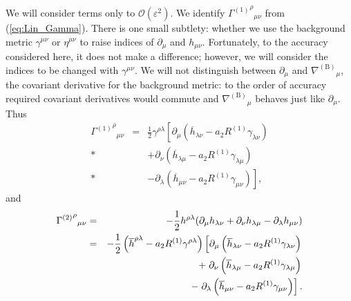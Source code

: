 \documentclass[aps,prd,amsfonts,amssymb,amsmath,nofootinbib,reprint,showpacs]{revtex4-1}
\newcommand{\eqnref}[1]{(\ref{eq:#1})}
\newcommand{\order}[1]{\ensuremath{\mathcal{O}({#1})}}
\begin{document}
We will consider terms only to $\order{\varepsilon^2}$. We identify ${{\Gamma^{(1)}}^\rho}_{\mu\nu}$ from \eqnref{Lin_Gamma}. There is one small subtlety: whether we use the background metric $\gamma^{\mu\nu}$ or $\eta^{\mu\nu}$ to raise indices of $\partial_\mu$ and $h_{\mu\nu}$. Fortunately, to the accuracy considered here, it does not make a difference; however, we will consider the indices to be changed with $\gamma^{\mu\nu}$. We will not distinguish between $\partial_\mu$ and ${\nabla^{(\text{B})}}_\mu$, the covariant derivative for the background metric: to the order of accuracy required covariant derivatives would commute and ${\nabla^{(\text{B})}}_\mu$ behaves just like $\partial_\mu$. Thus
\begin{eqnarray}
{{\Gamma^{(1)}}^\rho}_{\mu\nu} & = & \frac{1}{2}\gamma^{\rho\lambda}\left[\partial_\mu \left(\overline{h}_{\lambda\nu} - a_2 R^{(1)}\gamma_{\lambda\nu}\right) \right. \nonumber \\* 
 & & + \left. \partial_\nu \left(\overline{h}_{\lambda\mu} - a_2 R^{(1)}\gamma_{\lambda\mu}\right) \right. \nonumber \\*
 & & - \left. \partial_\lambda \left(\overline{h}_{\mu\nu} - a_2 R^{(1)}\gamma_{\mu\nu}\right)\right],
\end{eqnarray}
and
\begin{eqnarray}
{{\Gamma^{(2)}}^\rho}_{\mu\nu} & = & -\frac{1}{2}h^{\rho\lambda}(\partial_\mu h_{\lambda\nu} + \partial_\nu h_{\lambda\mu} - \partial_\lambda h_{\mu\nu}) \nonumber \\*
 & = & -\frac{1}{2}\left(\overline{h}^{\rho\lambda} - a_2 R^{(1)}\gamma^{\rho\lambda}\right)\left[\partial_\mu \left(\overline{h}_{\lambda\nu} - a_2 R^{(1)}\gamma_{\lambda\nu}\right)  \right. \nonumber \\*
 & & + \left. \partial_\nu \left(\overline{h}_{\lambda\mu} - a_2 R^{(1)}\gamma_{\lambda\mu}\right) \right. \nonumber \\*
 & & - \left. \partial_\lambda \left(\overline{h}_{\mu\nu} \vphantom{R^{(1)}} - a_2 R^{(1)}\gamma_{\mu\nu}\right)\right].
\end{eqnarray}
\end{document}
